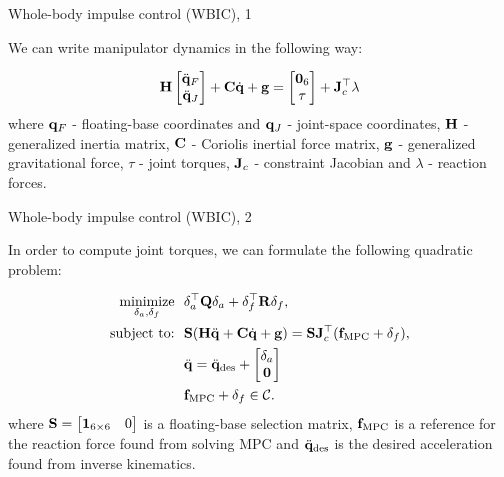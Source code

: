 \documentclass{beamer}
\begin{document}
\begin{frame}{Whole-body impulse control (WBIC), 1}
	\begin{flushleft}
		
		We can write manipulator dynamics in the following way:
		
		\begin{equation}
			\mathbf{H}
			\begin{bmatrix}
				\ddot{\mathbf{q}}_F \\ \ddot{\mathbf{q}}_J 
			\end{bmatrix}
		+ \mathbf{C} \dot{\mathbf{q}} + \mathbf{g}
		=
		\begin{bmatrix}
			\mathbf{0}_6 \\ \tau
		\end{bmatrix}
		+
		\mathbf{J}_c^\top \lambda 
		\end{equation}
		where $\mathbf{q}_F$ - floating-base coordinates and $\mathbf{q}_J$ - joint-space coordinates, $\mathbf{H}$ - generalized inertia matrix, $\mathbf{C}$ - Coriolis inertial force matrix, $\mathbf{g}$ - generalized gravitational force, $\tau$ - joint torques, $\mathbf{J}_c$ - constraint Jacobian and $\lambda$ - reaction forces.
		
		
	\end{flushleft}
\end{frame}



\begin{frame}{Whole-body impulse control (WBIC), 2}
	\begin{flushleft}
		
		In order to compute joint torques, we can formulate the following quadratic problem:
		
		\begin{align*}
			\underset{\delta_a, \delta_f}{\text{minimize}}
			& \ \ \delta_a\T \bo{Q} \delta_a + \delta_f\T \bo{R} \delta_f,
			\\
			\text{subject to:} & \ \ 
			\bo{S} ( \bo{H} \ddot{\bo{q}}  + \bo{C} \dot{\bo{q}} + \bo{g} ) =
			\bo{S}\bo{J}_c\T (\bo{f}_\text{MPC} +  \delta_f) ,
			\\
			& \ \ \ddot{\bo{q}} = \ddot{\bo{q}}_\text{des} + 
			\begin{bmatrix}
				 \delta_a \\ \bo{0}
			\end{bmatrix}
			\\
			& \ \ \bo{f}_\text{MPC} +  \delta_f \in \mathcal{C}.
		\end{align*}
		where $\mathbf{S} = \begin{bmatrix}
			\mathbf{1}_{6 \times 6} & 0
		\end{bmatrix}$ is  a floating-base selection matrix, $\mathbf{f}_\text{MPC}$ is a reference for the reaction force found from solving MPC and $\ddot{\mathbf{q}}_\text{des}$ is the desired acceleration found from inverse kinematics.
		
	\end{flushleft}
\end{frame}
\end{document}
